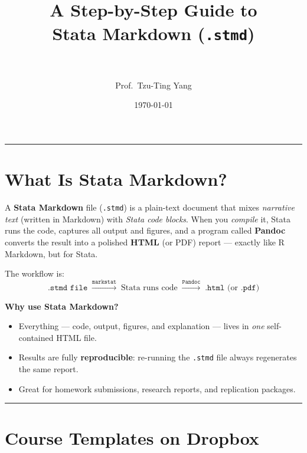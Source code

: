\documentclass[paper=a4, fontsize=11pt]{scrartcl}
\title{
\normalfont \normalsize
\horrule{0.5pt} \\[0.4cm]
\huge A Step-by-Step Guide to \\[0.2cm] Stata Markdown (\texttt{.stmd}) \\
\horrule{2pt} \\[0.5cm]
}
\author{Prof.\ Tzu-Ting Yang}
\date{\normalsize\today}
\newcommand{\horrule}[1]{\rule{\linewidth}{#1}}
\begin{document}
\maketitle

\tableofcontents
\bigskip\horrule{0.4pt}\bigskip

\section{What Is Stata Markdown?}

A \textbf{Stata Markdown} file (\texttt{.stmd}) is a plain-text document that mixes
\textit{narrative text} (written in Markdown) with \textit{Stata code blocks}.
When you \textit{compile} it, Stata runs the code, captures all output and figures,
and a program called \textbf{Pandoc} converts the result into a polished
\textbf{HTML} (or PDF) report --- exactly like R Markdown, but for Stata.

\medskip
The workflow is:
\[
\texttt{.stmd file} \;\xrightarrow{\texttt{markstat}}\; \text{Stata runs code}
\;\xrightarrow{\texttt{Pandoc}}\; \texttt{.html} \text{ (or } \texttt{.pdf}\text{)}
\]

\bigskip

\begin{tipbox}
\textbf{Why use Stata Markdown?}
\begin{itemize}
  \item Everything --- code, output, figures, and explanation --- lives in \textit{one}
        self-contained HTML file.
  \item Results are fully \textbf{reproducible}: re-running the \texttt{.stmd} file
        always regenerates the same report.
  \item Great for homework submissions, research reports, and replication packages.
\end{itemize}
\end{tipbox}

\bigskip\horrule{0.4pt}\bigskip

\section{Course Templates on Dropbox}
\end{document}
